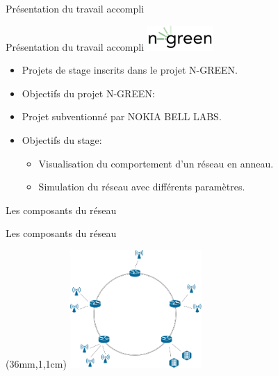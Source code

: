 \documentclass[10 pt]{beamer}
\begin{document}
\begin{section}{Pr\'esentation du travail accompli}

\begin{frame}
\tableofcontents[currentsection]
\end{frame}

\begin{frame}{Pr\'esentation du travail accompli}
\centering \includegraphics [width=25mm]{logos/logo_n-green.png}
\vspace{0,5cm}
\begin{itemize}
\item Projets de stage inscrits dans le projet N-GREEN.
\vspace{0,2cm}
\item Objectifs du projet N-GREEN:
\vspace{0,20cm}
\item Projet subventionn\'e par NOKIA BELL LABS.
\vspace{0,20cm}

\item Objectifs du stage:
\begin{itemize}
\item Visualisation du comportement d'un r\'eseau en anneau.
\item Simulation du r\'eseau avec diff\'erents param\`etres.
\end{itemize}
\end{itemize}

\end{frame}




\begin{subsection}{Les composants du r\'eseau}
\begin{frame}{Les composants du r\'eseau}


\begin{textblock*}{5cm}(36mm,1,1cm) %
\includegraphics [width=5cm]{logos/anneau_N-GREEN.png}
\end{textblock*}



\end{frame}
\end{subsection}
\end{section}
\end{document}
